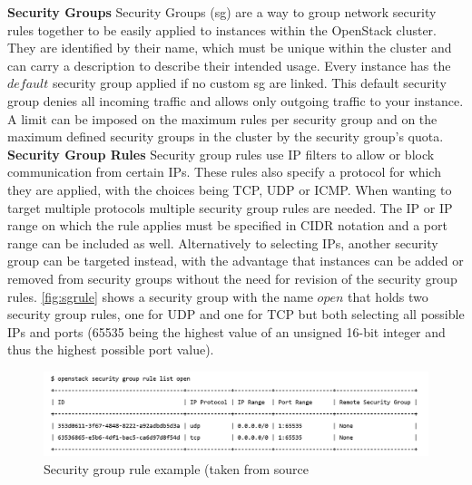 \textbf{Security Groups}\label{sec:securitygroups} Security Groups (\acrshort{sg}) are a way to group network security rules together to be easily applied to instances within the OpenStack cluster. They are identified by their name, which must be unique within the cluster and can carry a description to describe their intended usage. Every instance has the $default$ security group applied if no custom \acrshort{sg} are linked. This default security group denies all incoming traffic and allows only outgoing traffic to your instance. A limit can be imposed on the maximum rules per security group and on the maximum defined security groups in the cluster by the security group's quota. \cite{sg} \cite{sgquotas}
\\[10pt]

\textbf{Security Group Rules}\label{sec:securitygrouprules} Security group rules use IP filters to allow or block communication from certain IPs. These rules also specify a protocol for which they are applied, with the choices being TCP, UDP or ICMP. When wanting to target multiple protocols multiple security group rules are needed. The IP or IP range on which the rule applies must be specified in CIDR notation and a port range can be included as well. Alternatively to selecting IPs, another security group can be targeted instead, with the advantage that instances can be added or removed from security groups without the need for revision of the security group rules. \autoref{fig:sgrule} shows a security group with the name $open$ that holds two security group rules, one for UDP and one for TCP but both selecting all possible IPs and ports (65535 being the highest value of an unsigned 16-bit integer and thus the highest possible port value). \cite{sgrule}
\\[10pt]

\begin{figure}[htbp]
  \centering
  \includegraphics[width=\textwidth]{images/sgrule example.png} 
  \caption{Security group rule example (taken from source \cite{sg}}
  \label{fig:sgrule}
\end{figure}

\cleardoublepage
